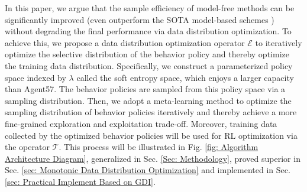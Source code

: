 \documentclass[nohyperref]{article}
\theoremstyle{plain}
\begin{document}
In this paper, we argue that the sample efficiency of model-free methods can be significantly improved  (even outperform the SOTA model-based schemes \cite{dreamerv2}) without degrading the final performance  via data distribution optimization.   To achieve this, we propose a data distribution optimization operator $\mathcal{E}$ to iteratively optimize the selective distribution of the behavior policy  and  thereby optimize the training data distribution. Specifically, we  construct a parameterized  policy space indexed by $\lambda$ called the soft entropy space, which enjoys a larger capacity  than Agent57. The behavior policies are sampled  from this policy space via a sampling distribution. Then, we adopt a meta-learning method to  optimize the sampling distribution of behavior policies iteratively and thereby achieve a more fine-grained exploration and exploitation trade-off. Moreover, training data collected by the optimized behavior policies will be used for RL optimization via the operator $\mathcal{T}$. This process will be illustrated in Fig. \ref{fig: Algorithm Architecture Diagram}, generalized in Sec. \ref{Sec: Methodology}, proved  superior in Sec. \ref{sec: Monotonic Data Distribution Optimization} and implemented in Sec. \ref{sec: Practical Implement Based on GDI}.
\end{document}
